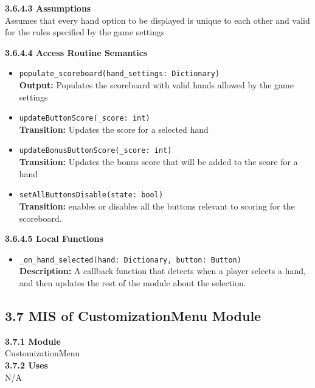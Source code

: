 \documentclass[12pt, titlepage]{article}
\begin{document}
\textbf{3.6.4.3 Assumptions}\\
Assumes that every hand option to be displayed is unique to each other and valid for the rules specified by the game settings

\textbf{3.6.4.4 Access Routine Semantics}
\begin{itemize}

	\item \texttt{populate\_scoreboard(hand\_settings: Dictionary)}\\
	\textbf{Output:} Populates the scoreboard with valid hands allowed by the game settings
	
	
	\item \texttt{updateButtonScore(\_score: int)}\\
	\textbf{Transition:} Updates the score for a selected hand
	
	
	\item \texttt{updateBonusButtonScore(\_score: int)}\\
	\textbf{Transition:} Updates the bonus score that will be added to the score for a hand
	
	
	\item \texttt{setAllButtonsDisable(state: bool)}\\
	\textbf{Transition:} enables or disables all the buttons relevant to scoring for the scoreboard.
	
	


\end{itemize}

\textbf{3.6.4.5 Local Functions}

\begin{itemize}
    \item \texttt{\_on\_hand\_selected(hand: Dictionary, button: Button)}\\
    \textbf{Description:} A callback function that detects when a player selects a hand, and then updates the rest of the module about the selection.

\end{itemize}


\subsection*{3.7 MIS of CustomizationMenu Module}
\textbf{3.7.1 Module}\\
 CustomizationMenu\\

\noindent \textbf{3.7.2 Uses}\\
N/A \\
\end{document}
